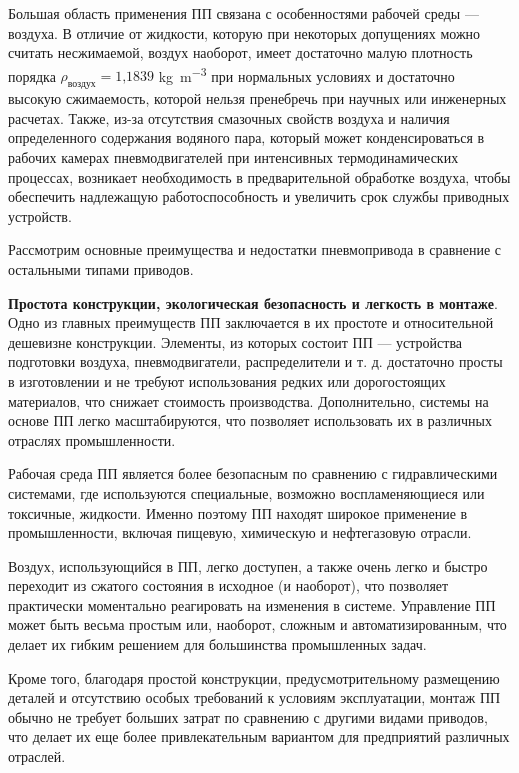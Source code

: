 Большая область применения ПП связана с особенностями рабочей среды --- воздуха. В отличие
от жидкости, которую при некоторых допущениях можно считать несжимаемой, воздух наоборот, имеет достаточно
малую плотность порядка $\rho_{\text{воздух}} = \text{1,1839}$ \si{\kilogram\per\cubic\metre} при нормальных условиях
и достаточно высокую сжимаемость, которой нельзя пренебречь при научных или инженерных расчетах. Также, из-за
отсутствия смазочных свойств воздуха и наличия определенного содержания водяного пара, который может конденсироваться
в рабочих камерах пневмодвигателей при интенсивных термодинамических процессах, возникает необходимость в предварительной
обработке воздуха, чтобы обеспечить надлежащую работоспособность и увеличить срок службы приводных устройств.

Рассмотрим основные преимущества и недостатки пневмопривода в сравнение с остальными типами приводов.

\textbf{Простота конструкции, экологическая безопасность и легкость в монтаже}. Одно из главных преимуществ
ПП заключается
в их простоте и относительной дешевизне конструкции. Элементы, из которых состоит ПП --- устройства
подготовки воздуха, пневмодвигатели, распределители и т. д. достаточно просты в изготовлении и не требуют использования редких или дорогостоящих
материалов, что снижает стоимость производства. Дополнительно, системы на основе ПП легко масштабируются,
что позволяет использовать их в различных отраслях промышленности.


Рабочая среда ПП является более безопасным по сравнению
с гидравлическими системами, где используются специальные, возможно воспламеняющиеся
или токсичные, жидкости. Именно поэтому ПП находят широкое применение в
промышленности, включая пищевую, химическую и нефтегазовую отрасли.


Воздух, использующийся в ПП, легко доступен, а также очень легко и
быстро переходит из сжатого состояния в исходное (и наоборот), что позволяет практически моментально
реагировать на изменения в системе. Управление ПП может быть весьма простым или,
наоборот, сложным и автоматизированным, что делает их гибким решением для большинства промышленных задач.


Кроме того, благодаря простой конструкции, предусмотрительному размещению деталей и
отсутствию особых требований к условиям эксплуатации, монтаж ПП обычно не
требует больших затрат по сравнению с другими видами приводов, что делает их еще более
привлекательным вариантом для предприятий различных отраслей.


